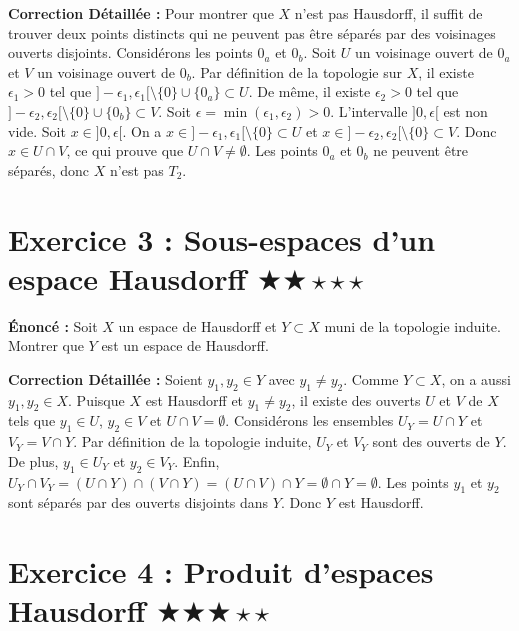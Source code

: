 \documentclass[11pt,a4paper]{article}
\begin{document}
\textbf{Correction Détaillée :}
Pour montrer que $X$ n'est pas Hausdorff, il suffit de trouver deux points distincts qui ne peuvent pas être séparés par des voisinages ouverts disjoints. Considérons les points $0_a$ et $0_b$.
Soit $U$ un voisinage ouvert de $0_a$ et $V$ un voisinage ouvert de $0_b$.
Par définition de la topologie sur $X$, il existe $\epsilon_1 > 0$ tel que $]-\epsilon_1, \epsilon_1[ \setminus \{0\} \cup \{0_a\} \subset U$.
De même, il existe $\epsilon_2 > 0$ tel que $]-\epsilon_2, \epsilon_2[ \setminus \{0\} \cup \{0_b\} \subset V$.
Soit $\epsilon = \min(\epsilon_1, \epsilon_2) > 0$. L'intervalle $]0, \epsilon[$ est non vide.
Soit $x \in ]0, \epsilon[$. On a $x \in ]-\epsilon_1, \epsilon_1[ \setminus \{0\} \subset U$ et $x \in ]-\epsilon_2, \epsilon_2[ \setminus \{0\} \subset V$.
Donc $x \in U \cap V$, ce qui prouve que $U \cap V \neq \emptyset$.
Les points $0_a$ et $0_b$ ne peuvent être séparés, donc $X$ n'est pas $T_2$.





\section{Exercice 3 : Sous-espaces d'un espace Hausdorff \quad $\bigstar\bigstar\star\star\star$}


\textbf{Énoncé :}
Soit $X$ un espace de Hausdorff et $Y \subset X$ muni de la topologie induite. Montrer que $Y$ est un espace de Hausdorff.

\textbf{Correction Détaillée :}
Soient $y_1, y_2 \in Y$ avec $y_1 \neq y_2$. Comme $Y \subset X$, on a aussi $y_1, y_2 \in X$.
Puisque $X$ est Hausdorff et $y_1 \neq y_2$, il existe des ouverts $U$ et $V$ de $X$ tels que $y_1 \in U$, $y_2 \in V$ et $U \cap V = \emptyset$.
Considérons les ensembles $U_Y = U \cap Y$ et $V_Y = V \cap Y$.
Par définition de la topologie induite, $U_Y$ et $V_Y$ sont des ouverts de $Y$.
De plus, $y_1 \in U_Y$ et $y_2 \in V_Y$.
Enfin, $U_Y \cap V_Y = (U \cap Y) \cap (V \cap Y) = (U \cap V) \cap Y = \emptyset \cap Y = \emptyset$.
Les points $y_1$ et $y_2$ sont séparés par des ouverts disjoints dans $Y$. Donc $Y$ est Hausdorff.





\section{Exercice 4 : Produit d'espaces Hausdorff \quad $\bigstar\bigstar\bigstar\star\star$}
\end{document}
